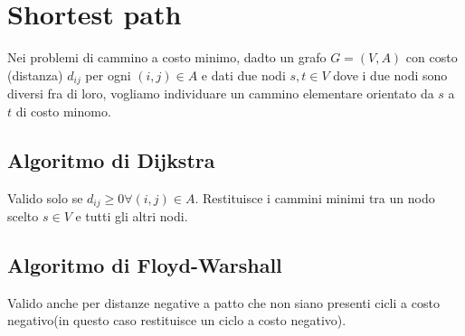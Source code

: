 \section{Shortest path}

Nei problemi di cammino a costo minimo, dadto un grafo $G=(V,A)$ con costo (distanza) $d_{ij}$ per ogni 
$(i, j) \in A$ e dati due nodi $s, t \in V$ dove i due nodi sono diversi fra di loro, vogliamo individuare un cammino
elementare orientato da $s$ a $t$ di costo minomo.

\subsection{Algoritmo di Dijkstra}
Valido solo se $d_{ij} \geq 0 \forall (i, j) \in A$.
Restituisce i cammini minimi tra un nodo scelto $s \in V$ e tutti gli altri nodi.

\subsection{Algoritmo di Floyd-Warshall}
Valido anche per distanze negative a patto che non siano presenti cicli a costo negativo(in questo caso restituisce un ciclo a costo negativo).


